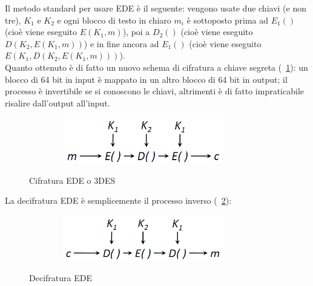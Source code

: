 Il metodo standard per usare EDE è il seguente: vengono usate due chiavi (e non tre), $K_{1}$ e $K_{2}$ e ogni blocco di testo in chiaro $m_{i}$ è sottoposto prima ad $E_{1}()$ (cioè viene eseguito $E(K_{1}, m)$), poi a $D_{2}()$ (cioè viene eseguito $D(K_{2}, E(K_{1}, m))$) e in fine ancora ad $E_{1}()$ (cioè viene eseguito $E(K_{1}, D(K_{2},
E(K_{1}, m)))$).\\
Quanto ottenuto è di fatto un nuovo schema di cifratura a chiave segreta (\figurename ~\ref{fig:EDE}): un blocco di 64 bit in input è mappato in un altro blocco di 64 bit in output; il processo è invertibile se si conoscono le chiavi, altrimenti è di fatto impraticabile risalire dall'output all'input.
\begin{figure}[htbp]
	\centering%
	\subfigure%
	{\includegraphics[height=2cm, width=10cm, keepaspectratio]{Immagini/Capitolo3/EDE.png}}
	\caption{Cifratura EDE o 3DES \label{fig:EDE}} 	
\end{figure}
La decifratura EDE è semplicemente il processo inverso (\figurename ~\ref{fig:DED}):
\begin{figure}[htbp]
	\centering%
	\subfigure%
	{\includegraphics[height=2cm, width=10cm, keepaspectratio]{Immagini/Capitolo3/DED.png}}
	\caption{Decifratura EDE \label{fig:DED}} 	
\end{figure}
